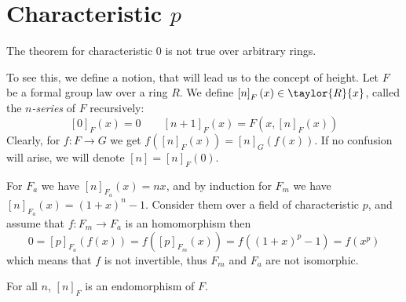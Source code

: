 \section{Characteristic $p$}

\begin{remark*}
	The theorem for characteristic 0 is not true over arbitrary rings.
	
	To see this, we define a notion, that will lead us to the concept of height.
	Let $F$ be a formal group law over a ring $R$. We define $\left[n\right]_F \left(x\right) \in \taylor{R}{x}$, called the \emph{$n$-series} of $F$ recursively:
	$$
		\left[0\right]_F \left(x\right) = 0
		\qquad
		\left[n+1\right]_F \left(x\right) = F\left(x, \left[n\right]_F \left(x\right)\right)
	$$
	Clearly, for $f: F \to G$ we get
	$
		f\left(\left[n\right]_F \left(x\right)\right)
		=
		\left[n\right]_G \left(f\left(x\right)\right)
	$.
	If no confusion will arise, we will denote $\left[n\right] = \left[n\right]_F\left(0\right)$.
	
	For $F_a$ we have $\left[n\right]_{F_a} \left(x\right) = nx$,
	and by induction for $F_m$ we have $\left[n\right]_{F_a} \left(x\right) = \left(1+x\right)^n - 1$.
	Consider them over a field of characteristic $p$, and assume that $f: F_m \to F_a$ is an homomorphism then
	$$
		0
		=
		\left[p\right]_{F_a} \left(f\left(x\right)\right)
		=
		f\left(\left[p\right]_{F_m} \left(x\right)\right)
		=
		f\left(\left(1+x\right)^p-1\right)
		=
		f\left(x^p\right)
	$$
	which means that $f$ is not invertible, thus $F_m$ and $F_a$ are not isomorphic.
\end{remark*}

\begin{claim*}
	For all $n$, $\left[n\right]_F$ is an endomorphism of $F$.
\end{claim*}

